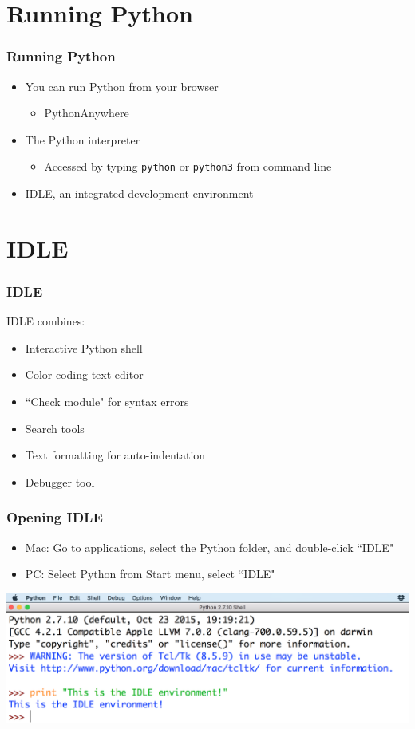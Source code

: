\documentclass{beamer}
\newcommand{\<}{\langle}
\renewcommand{\>}{\rangle}
\begin{document}
\section{Running Python}

\begin{frame}[fragile]
\frametitle{Running Python}

\begin{itemize}
\item You can run Python from your browser 
	\begin{itemize}
	\item PythonAnywhere
	\end{itemize}
\item  The Python interpreter
	\begin{itemize}
	\item Accessed by typing \verb|python| or \verb|python3|  from command line
	\end{itemize}
\item IDLE, an integrated development environment
\end{itemize}
\end{frame}


\section{IDLE}


\begin{frame}
\frametitle{IDLE}
IDLE combines: 

\begin{itemize}
\item Interactive Python shell
\item Color-coding text editor
\item ``Check module" for syntax errors
\item Search tools
\item Text formatting for auto-indentation
\item Debugger tool
\end{itemize}
\end{frame}

\begin{frame}
\frametitle{Opening IDLE}

\begin{itemize}
\item Mac: Go to applications, select the Python folder, and double-click ``IDLE"
\item PC: Select Python from Start menu, select ``IDLE"
\end{itemize}
\centering
\includegraphics[scale=.3]{IMG/1idle.png}
\end{frame}
\end{document}
